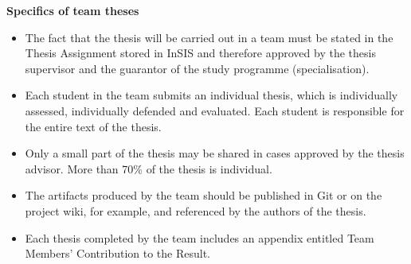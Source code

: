 {\bfseries\sffamily\Large Specifics of team theses}
\begin{itemize}
\item \vspace*{-2ex}The fact that the thesis will be carried out in a team must be stated in the Thesis Assignment stored in InSIS and therefore approved by the thesis supervisor and the guarantor of the study programme (specialisation).
\item Each student in the team submits an individual thesis, which is individually assessed, individually defended and evaluated. Each student is responsible for the entire text of the thesis.
\item Only a small part of the thesis may be shared in cases approved by the thesis advisor. More than 70$\%$ of the thesis is individual.
\item The artifacts produced by the team should be published in Git or on the project wiki, for example, and referenced by the authors of the thesis.
\item Each thesis completed by the team includes an appendix entitled Team Members' Contribution to the Result.
\end{itemize}
